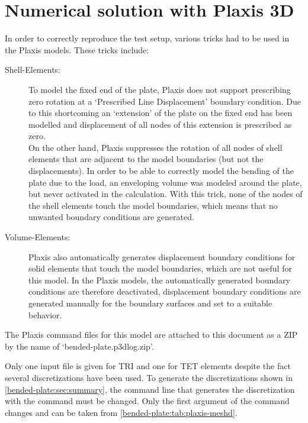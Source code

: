 
\section{Numerical solution with Plaxis 3D}
\label{bended-plate:sec:plaxis3D}

In order to correctly reproduce the test setup, various tricks had to be used
in the Plaxis models. These tricks include:

\begin{description}
    \item [Shell-Elements:]{To model the fixed end of the plate, Plaxis does not
          support prescribing zero rotation at a ‘Prescribed Line
          Displacement’ boundary condition. Due to this shortcoming
          an ‘extension’ of the plate on the fixed end has been
          modelled and displacement of all nodes of this extension is
          prescribed as zero.\\
          On the other hand, Plaxis suppresses the rotation of all nodes
          of shell elements that are adjacent to the model boundaries (but
          not the displacements). In order to be able to correctly model the
          bending of the plate due to the load, an enveloping volume was
          modeled around the plate, but never activated in the calculation.
          With this trick, none of the nodes of the shell elements touch the
          model boundaries, which means that no unwanted boundary conditions
          are generated.}
    \item [Volume-Elements:]{Plaxis also automatically generates displacement
          boundary conditions for solid elements that touch the model boundaries,
          which are not useful for this model. In the Plaxis models, the
          automatically generated boundary conditions are therefore deactivated,
          displacement boundary conditions are generated manually for the
          boundary surfaces and set to a suitable behavior.}
\end{description}

The Plaxis command files for this model are attached to this document as a ZIP
by the name of ‘bended-plate.p3dlog.zip’.


Only one input file is given for TRI and one for TET elements despite the fact
several discretizations have been used. To generate the discretizations shown
in \autoref{bended-plate:sec:summary}, the command line that generates the
discretization with the  command must be changed. Only the
first argument of the  command changes and can be taken from
\autoref{bended-plate:tab:plaxis-meshd}.

